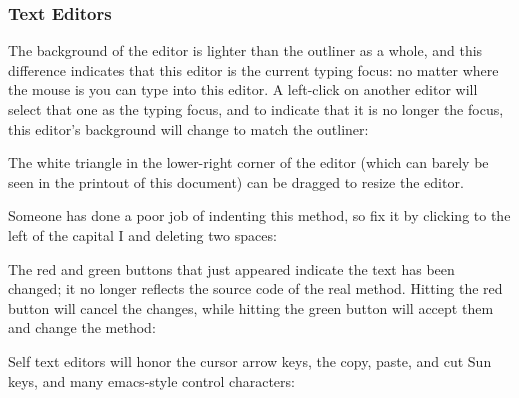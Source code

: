 \documentclass[letterpaper,10pt,english]{sphinxmanual}
\begin{document}
\subsubsection{Text Editors}
\label{\detokenize{howtoprg:text-editors}}
The background of the editor is lighter than the outliner as a whole, and this difference indicates
that this editor is the current typing focus: no matter where the mouse is you can type into this editor.
A left-click on another editor will select that one as the typing focus, and to indicate that it is
no longer the focus, this editor’s background will change to match the outliner:
\begin{figure}[htbp]
\centering

\noindent{}
\end{figure}

The white triangle in the lower-right corner of the editor (which can barely be seen in the printout
of this document) can be dragged to resize the editor.

Someone has done a poor job of indenting this method, so fix it by clicking to the left of the capital\textendash{}
I and deleting two spaces:
\begin{figure}[htbp]
\centering

\noindent{}
\end{figure}

The red and green buttons that just appeared indicate the text has been changed; it no longer reflects
the source code of the real method. Hitting the red button will cancel the changes, while hitting
the green button will accept them and change the method:
\begin{figure}[htbp]
\centering

\noindent{}
\end{figure}

Self text editors will honor the cursor arrow keys, the copy, paste, and cut Sun keys, and
many emacs-style control characters:
\end{document}
